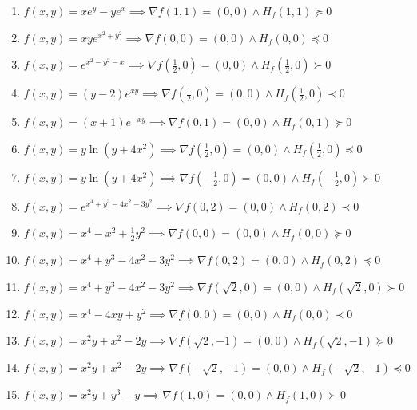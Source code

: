 \documentclass[11pt,a4paper]{article}
\begin{document}
\begin{enumerate}
\item $\displaystyle f(x, y) = x e^{y} - y e^{x} \implies \nabla f(1, 1) = (0, 0) \land H_{f}(1, 1) \succeq 0$
\item $\displaystyle f(x, y) = xy e^{x^{2} + y^{2}} \implies \nabla f(0, 0) = (0, 0) \land H_{f}(0, 0) \preceq 0$
\item $\displaystyle f(x, y) = e^{x^{2} - y^{2} - x} \implies \nabla f\left( \frac{1}{2}, 0 \right) = (0, 0) \land H_{f}\left( \frac{1}{2}, 0 \right) \succ 0$
\item $\displaystyle f(x, y) = (y - 2) e^{xy} \implies \nabla f\left( \frac{1}{2}, 0 \right) = (0, 0) \land H_{f}\left( \frac{1}{2}, 0 \right) \prec 0$
\item $\displaystyle f(x, y) = (x + 1) e^{-xy} \implies \nabla f(0, 1) = (0, 0) \land H_{f}(0, 1) \succeq 0$
\item $\displaystyle f(x, y) = y \ln(y + 4x^{2}) \implies \nabla f\left( \frac{1}{2}, 0 \right) = (0, 0) \land H_{f}\left( \frac{1}{2}, 0 \right) \preceq 0$
\item $\displaystyle f(x, y) = y \ln(y + 4x^{2}) \implies \nabla f\left( -\frac{1}{2}, 0 \right) = (0, 0) \land H_{f}\left( -\frac{1}{2}, 0 \right) \succ 0$
\item $\displaystyle f(x, y) = e^{x^{4} + y^{3} - 4x^{2} - 3y^{2}} \implies \nabla f(0, 2) = (0, 0) \land H_{f}(0, 2) \prec 0$
\item $\displaystyle f(x, y) = x^{4} - x^{2} + \frac{1}{2} y^{2} \implies \nabla f(0, 0) = (0, 0) \land H_{f}(0, 0) \succeq 0$
\item $\displaystyle f(x, y) = x^{4} + y^{3} - 4x^{2} - 3y^{2} \implies \nabla f(0, 2) = (0, 0) \land H_{f}(0, 2) \preceq 0$
\item $\displaystyle f(x, y) = x^{4} + y^{3} - 4x^{2} - 3y^{2} \implies \nabla f\left( \sqrt{2}, 0 \right) = (0, 0) \land H_{f}\left( \sqrt{2}, 0 \right) \succ 0$
\item $\displaystyle f(x, y) = x^{4} - 4xy + y^{2} \implies \nabla f(0, 0) = (0, 0) \land H_{f}(0, 0) \prec 0$
\item $\displaystyle f(x, y) = x^{2} y + x^{2} - 2y \implies \nabla f\left( \sqrt{2}, -1 \right) = (0, 0) \land H_{f}\left( \sqrt{2}, -1 \right) \succeq 0$
\item $\displaystyle f(x, y) = x^{2} y + x^{2} - 2y \implies \nabla f\left( -\sqrt{2}, -1 \right) = (0, 0) \land H_{f}\left( -\sqrt{2}, -1 \right) \preceq 0$
\item $\displaystyle f(x, y) = x^{2} y + y^{3} - y \implies \nabla f(1, 0) = (0, 0) \land H_{f}(1, 0) \succ 0$

\end{enumerate}
\end{document}
